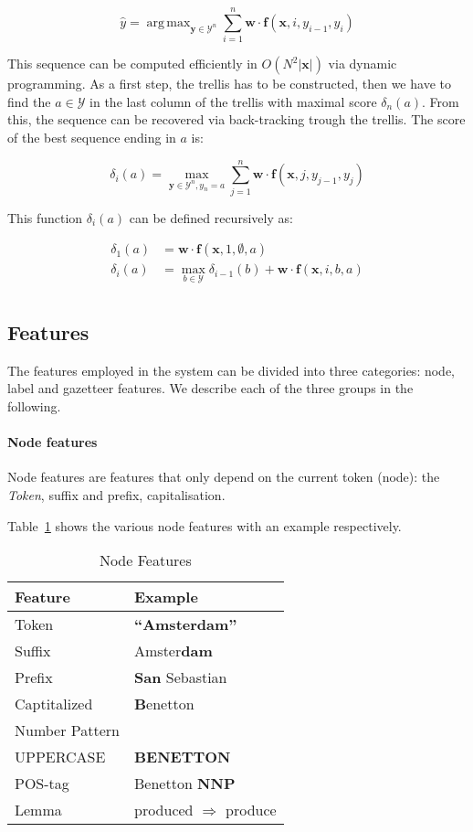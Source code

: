 \documentclass[11pt]{article}
\DeclareMathOperator*{\argmax}{arg\,max}
\begin{document}
\[
\hat{y} = \argmax_{\mathbf{y} \in \mathcal{Y}^{n}} \sum_{i=1}^{n}\mathbf{w} \cdot \boldsymbol{f}(\mathbf{x}, i, y_{i-1}, y_{i})
\]

This sequence can be computed efficiently in $ O( N^2 |\mathbf{x}| ) $ via dynamic programming. 
As a first step, the trellis has to be constructed, then we have to find the $ a \in \mathcal{Y}$ in the 
last column of the trellis with maximal score $\delta_n(a)$. From this, the sequence can be recovered via back-tracking trough the trellis. 
The score of the best sequence ending in $a$ is:

\[
\delta_i(a) = \max_{\mathbf{y} \in \mathcal{Y}^{n}, y_n = a} \sum_{j=1}^{n}{\mathbf{w} \cdot \boldsymbol{f}(\mathbf{x}, j, y_{j-1}, y_{j})}
\]

\noindent This function $\delta_i(a)$ can be defined recursively as:

\begin{align*}
\delta_1(a) &= \mathbf{w} \cdot \boldsymbol{f}(\mathbf{x}, 1, \emptyset, a) \\
\delta_i(a) &= \max_{b \in \mathcal{Y}} \delta_{i-1}(b) + \mathbf{w} \cdot \boldsymbol{f}(\mathbf{x}, i, b, a) \\
\end{align*}


\subsection{Features}
The features employed in the system can be divided into three categories: node, label and gazetteer features. 
We describe each of the three groups in the following.

\paragraph*{Node features}
Node features are features that only depend on the current token (node): the \emph{Token}, suffix and prefix, capitalisation.

Table~\ref{table:node} shows the various node features with an example respectively.

\begin{table}[h!]
\begin{tabular}{| l | l |}
\hline
\bf Feature & \bf Example \\
\hline
Token &  \textbf{``Amsterdam''}\\
Suffix& Amster\textbf{dam}\\
Prefix&  \textbf{San} Sebastian\\
Captitalized& \textbf{B}enetton\\
Number Pattern & \\
UPPERCASE &  \textbf{BENETTON}\\
POS-tag &  Benetton \textbf{NNP}   \\
Lemma &  produced $\Rightarrow$ produce \\
\hline
\end{tabular}
\caption{Node Features}
\label{table:node}
\end{table}
\end{document}

